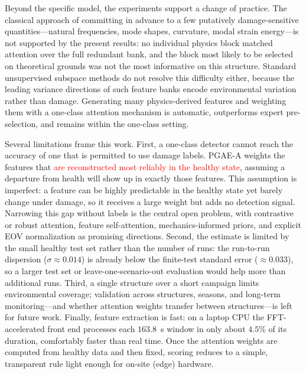 \documentclass[11pt,a4paper]{article}
\begin{document}
Beyond the specific model, the experiments support a change of practice. The
classical approach of committing in advance to a few putatively
damage-sensitive quantities---natural frequencies, mode shapes, curvature,
modal strain energy---is not supported by the present results: no individual
physics block matched attention over the full redundant bank, and the block
most likely to be selected on theoretical grounds was not the most informative
on this structure. Standard unsupervised subspace methods do not resolve this
difficulty either, because the leading variance directions of such feature banks
encode environmental variation rather than damage. Generating many
physics-derived features and weighting them with a one-class attention
mechanism is automatic, outperforms expert pre-selection, and remains within the
one-class setting.

Several limitations frame this work. First, a one-class detector cannot reach
the accuracy of one that is permitted to use damage labels. PGAE-A weights the
features that \textcolor{red}{are reconstructed most reliably in the healthy state}, assuming a
departure from health will show up in exactly those features. This assumption is
imperfect: a feature can be highly predictable in the healthy state yet barely
change under damage, so it receives a large weight but adds no detection signal.
Narrowing this gap without labels is the central open problem, with contrastive
or robust attention, feature self-attention, mechanics-informed priors, and
explicit EOV normalization as promising directions. Second, the estimate is
limited by the small healthy test set rather than the number of runs: the
run-to-run dispersion ($\sigma\approx0.014$) is already below the finite-test
standard error ($\approx0.033$), so a larger test set or leave-one-scenario-out
evaluation would help more than additional runs. Third, a single structure over
a short campaign limits environmental coverage; validation across structures,
seasons, and long-term monitoring---and whether attention weights transfer
between structures---is left for future work. Finally, feature extraction is fast: on a laptop
CPU the FFT-accelerated front end processes each $163.8$~s window in only about
$4.5\%$ of its duration, comfortably faster than real time. Once the attention
weights are computed from healthy data and then fixed, scoring reduces to a
simple, transparent rule light enough for on-site (edge) hardware.
\end{document}

